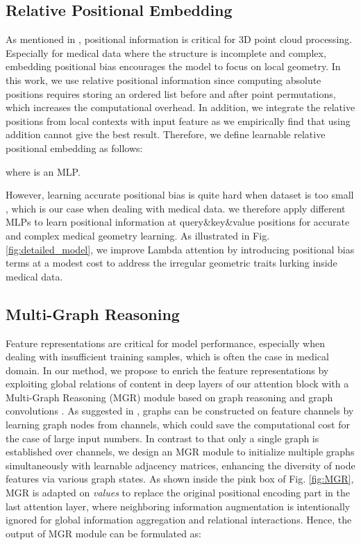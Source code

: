 \documentclass[10pt,twocolumn,letterpaper]{article}
\begin{document}
\subsection{Relative Positional Embedding} \label{relative_pos}
As mentioned in \cite{pt}, positional information is critical for 3D point cloud processing.
Especially for medical data where the structure is incomplete and complex, embedding positional bias encourages the model to focus on local geometry.
In this work, we use relative positional information since computing absolute positions requires storing an ordered list before and after point permutations, which increases the computational overhead.
In addition, we integrate the relative positions from local contexts with input feature as we empirically find that using addition cannot give the best result.
Therefore, we define learnable relative positional embedding as follows:

where  is an MLP.

However, learning accurate positional bias is quite hard when dataset is too small \cite{med-transformer}, which is our case when dealing with medical data.
we therefore apply different MLPs  to learn positional information at query\&key\&value positions for accurate and complex medical geometry learning.
As illustrated in Fig. \ref{fig:detailed_model}, we improve Lambda attention by introducing positional bias terms at a modest cost to address the irregular geometric traits lurking inside medical data.




\subsection{Multi-Graph Reasoning} \label{MGR}
Feature representations are critical for model performance, especially when dealing with insufficient training samples, which is often the case in medical domain.
In our method, we propose to enrich the feature representations by exploiting global relations of content in deep layers of our attention block with a Multi-Graph Reasoning (MGR) module based on graph reasoning \cite{glore} and graph convolutions \cite{gcn}.
As suggested in \cite{ma2020global}, graphs can be constructed on feature channels by learning graph nodes from channels, which could save the computational cost for the case of large input numbers.
In contrast to \cite{ma2020global} that only a single graph is established over channels, we design an MGR module to initialize multiple graphs simultaneously with learnable adjacency matrices, enhancing the diversity of node features via various graph states.
As shown inside the pink box of Fig. \ref{fig:MGR}, MGR is adapted on \textit{values} to replace the original positional encoding part in the last attention layer, where neighboring information augmentation is intentionally ignored for global information aggregation and relational interactions.
Hence, the output  of MGR module can be formulated as:
\end{document}
